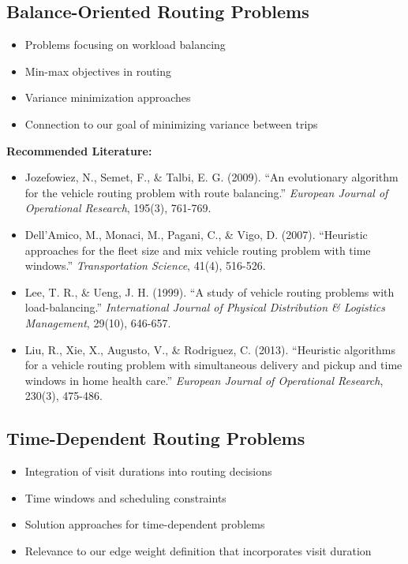 \subsection{Balance-Oriented Routing Problems}
\begin{itemize}
    \item Problems focusing on workload balancing
    \item Min-max objectives in routing
    \item Variance minimization approaches
    \item Connection to our goal of minimizing variance between trips
\end{itemize}

\noindent\textbf{Recommended Literature:}
\begin{itemize}
    \item Jozefowiez, N., Semet, F., \& Talbi, E. G. (2009). ``An evolutionary algorithm for the vehicle routing problem with route balancing.'' \textit{European Journal of Operational Research}, 195(3), 761-769.
    \item Dell'Amico, M., Monaci, M., Pagani, C., \& Vigo, D. (2007). ``Heuristic approaches for the fleet size and mix vehicle routing problem with time windows.'' \textit{Transportation Science}, 41(4), 516-526.
    \item Lee, T. R., \& Ueng, J. H. (1999). ``A study of vehicle routing problems with load-balancing.'' \textit{International Journal of Physical Distribution \& Logistics Management}, 29(10), 646-657.
    \item Liu, R., Xie, X., Augusto, V., \& Rodriguez, C. (2013). ``Heuristic algorithms for a vehicle routing problem with simultaneous delivery and pickup and time windows in home health care.'' \textit{European Journal of Operational Research}, 230(3), 475-486.
\end{itemize}

\subsection{Time-Dependent Routing Problems}
\begin{itemize}
    \item Integration of visit durations into routing decisions
    \item Time windows and scheduling constraints
    \item Solution approaches for time-dependent problems
    \item Relevance to our edge weight definition that incorporates visit duration
\end{itemize}

